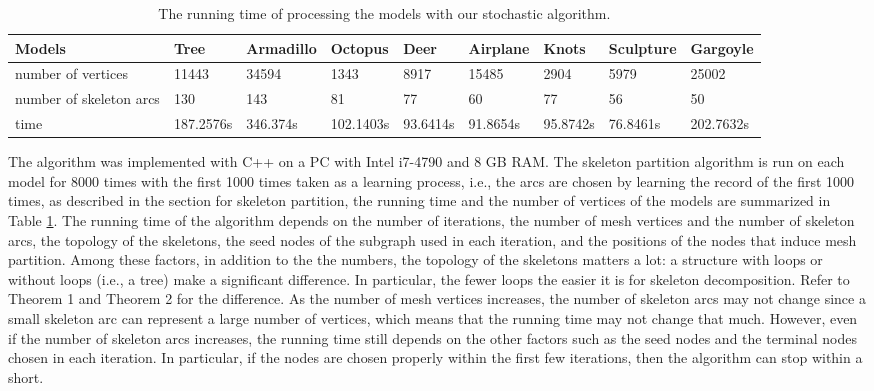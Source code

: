 \begin{table}[htb]

\begin{footnotesize}

\begin{center}

    \begin{tabular}{p{3.0cm} p{1.45cm} p{1.3cm} p{1.3cm} p{1.3cm} p{1.35cm} p{1.5cm} p{1.5cm}p{1.5cm}}

    \hline

     Models& Tree& Armadillo& Octopus& Deer& Airplane& Knots &Sculpture & Gargoyle\\ \hline
     number of vertices & 11443   & 34594   & 1343    & 8917  & 15485 & 2904    & 5979    &25002 \\ \hline
     number of skeleton arcs    &130 & 143 & 81 &77 &60 & 77 &56  &50 \\ \hline
     time    &187.2576s & 346.374s & 102.1403s &93.6414s &91.8654s & 95.8742s &76.8461s  &202.7632s \\
  \hline

    \end{tabular}

\end{center}

\end{footnotesize}

\caption{The running time of processing the models with our stochastic algorithm.}\label{tab:ertms:time}

\end{table}






The algorithm was implemented with C++ on a PC with Intel i7-4790 and 8 GB RAM. {\color{red}The skeleton partition algorithm is run on each model for 8000 times with the first 1000 times taken as a learning process, i.e., the arcs are chosen by learning the record of the first 1000 times, as described in the section for skeleton partition,} the running time and the number of vertices of the models are summarized in Table \ref{tab:ertms:time}. {\color{red} The running time of the algorithm depends on the number of iterations, the number of mesh vertices and the number of skeleton arcs, the topology of the skeletons, the seed nodes of the subgraph used in each iteration, and the positions of the nodes that induce mesh partition. Among these factors, in addition to the the numbers, the topology of the skeletons matters a lot: a structure with loops or without loops (i.e., a tree) make a significant difference. In particular, the fewer loops the easier it is for skeleton decomposition. Refer to Theorem 1 and Theorem 2 for the difference. As the number of mesh vertices increases, the number of skeleton arcs may not change since a small skeleton arc can represent a large number of vertices, which means that the running time may not change that much. However, even if the number of skeleton arcs increases, the running time still depends on the other factors such as the seed nodes and the terminal nodes chosen in each iteration. In particular, if the nodes are chosen properly within the first few iterations, then the algorithm can stop within a short.}

